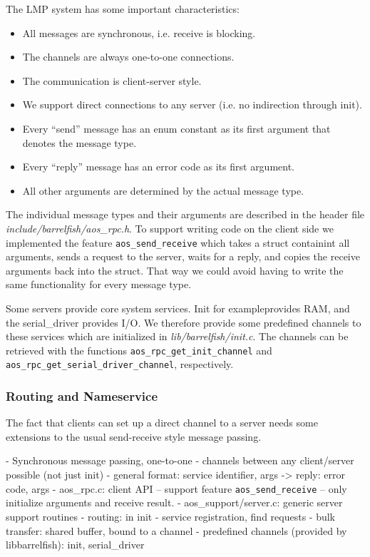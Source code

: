 \documentclass[a4paper,10pt]{article}
\newcommand{\filepath}[1]{\emph{ #1}}
\begin{document}
The LMP system has some important characteristics:
\begin{itemize}
 \item All messages are synchronous, i.e. receive is blocking.
 \item The channels are always one-to-one connections.
 \item The communication is client-server style.
 \item We support direct connections to any server (i.e. no indirection through init).
 \item Every ``send'' message has an enum constant as its first argument that denotes the message type.
 \item Every ``reply'' message has an error code as its first argument.
 \item All other arguments are determined by the actual message type.
\end{itemize}

The individual message types and their arguments are described in the header file \filepath{include/barrelfish/aos\_rpc.h}.
To support writing code on the client side we implemented the feature \lstinline!aos_send_receive! which takes a struct containint all arguments, 
sends a request to the server, waits for a reply, and copies the receive arguments back into the struct.
That way we could avoid having to write the same functionality for every message type.

Some servers provide core system services. Init for exampleprovides RAM, and the serial\_driver provides I/O.
We therefore provide some predefined channels to these services which are initialized in \filepath{lib/barrelfish/init.c}.
The channels can be retrieved with the functions \lstinline!aos_rpc_get_init_channel! and \lstinline!aos_rpc_get_serial_driver_channel!, respectively.

\subsubsection{Routing and Nameservice}

\todo {}
The fact that clients can set up a direct channel to a server needs some extensions to the usual send-receive style message passing.

- Synchronous message passing, one-to-one
- channels between any client/server possible (not just init)
- general format: service identifier, args -> reply: error code, args
- aos\_rpc.c: client API
-- support feature \lstinline!aos_send_receive!
-- only initialize arguments and receive result.
- aos\_support/server.c: generic server support routines
- routing: in init - service registration, find requests
- bulk transfer: shared buffer, bound to a channel
- predefined channels (provided by libbarrelfish): init, serial\_driver
\end{document}

